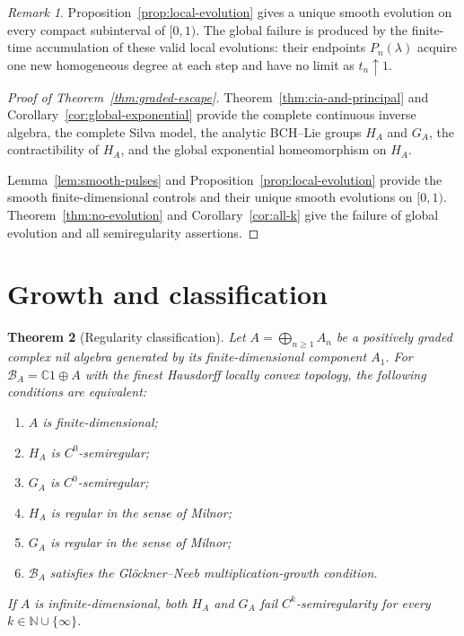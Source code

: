 \documentclass[11pt]{article}
\newtheorem{theorem}{Theorem}[section]
\theoremstyle{remark}
\newtheorem{remark}[theorem]{Remark}
\begin{document}
\begin{remark}
\label{rem:accumulation}
Proposition~\ref{prop:local-evolution} gives a unique smooth evolution on
every compact subinterval of $[0,1)$.  The global failure is produced by the
finite-time accumulation of these valid local evolutions: their endpoints
$P_n(\lambda)$ acquire one new homogeneous degree at each step and have no
limit as $t_n\uparrow1$.
\end{remark}

\begin{proof}[Proof of Theorem~\ref{thm:graded-escape}]
Theorem~\ref{thm:cia-and-principal} and
Corollary~\ref{cor:global-exponential} provide the complete continuous
inverse algebra, the complete Silva model, the analytic BCH--Lie groups
$H_A$ and $G_A$, the contractibility of $H_A$, and the global exponential
homeomorphism on $H_A$.

Lemma~\ref{lem:smooth-pulses} and
Proposition~\ref{prop:local-evolution} provide the smooth finite-dimensional
controls and their unique smooth evolutions on $[0,1)$.  Theorem~\ref{thm:no-evolution}
and Corollary~\ref{cor:all-k} give the failure of global evolution and all
semiregularity assertions.
\end{proof}

\section{Growth and classification}
\label{sec:consequences}

\begin{theorem}[Regularity classification]
\label{thm:classification}
Let $A=\bigoplus_{n\geq1}A_n$ be a positively graded complex nil algebra
generated by its finite-dimensional component $A_1$.  For
$\mathcal B_A=\mathbb C1\oplus A$ with the finest Hausdorff locally convex
topology, the following conditions are equivalent:
\begin{enumerate}[label=\textup{(\roman*)}]
\item $A$ is finite-dimensional;
\item $H_A$ is $C^0$-semiregular;
\item $G_A$ is $C^0$-semiregular;
\item $H_A$ is regular in the sense of Milnor;
\item $G_A$ is regular in the sense of Milnor;
\item $\mathcal B_A$ satisfies the Gl\"ockner--Neeb multiplication-growth
condition.
\end{enumerate}
If $A$ is infinite-dimensional, both $H_A$ and $G_A$ fail
$C^k$-semiregularity for every $k\in\mathbb N\cup\{\infty\}$.
\end{theorem}
\end{document}

